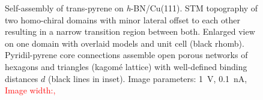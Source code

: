 \begin{figure}[] \centering
	\caption{Self-assembly of trans-pyrene on \textit{h}-BN/Cu(111).  STM topography of two homo-chiral domains with minor lateral offset to each other resulting in a narrow transition region between both.  Enlarged view on one domain with overlaid models and unit cell (black rhomb). Pyridil-pyrene core connections assemble open porous networks of hexagons and triangles (kagom\'e lattice) with well-defined binding distances $d$ (black lines in inset). Image parameters: \SI{1}{\volt}, \SI{0.1}{\nano \ampere}, \textcolor{red}{Image width:, }}
	\label{fig:pyrene-fig5}
\end{figure}

